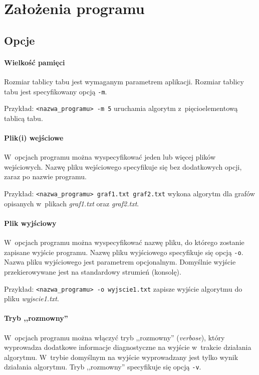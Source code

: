 \section{Założenia programu}

\subsection{Opcje}

\paragraph{Wielkość pamięci}

Rozmiar tablicy tabu jest wymaganym parametrem aplikacji. Rozmiar tablicy tabu jest specyfikowany opcją \verb+-m+. 

Przykład: \verb+<nazwa_programu> -m 5+ uruchamia algorytm z~pięcioelementową tablicą tabu.

\paragraph{Plik(i) wejściowe}

W~opcjach programu można wyspecyfikować jeden lub więcej plików wejściowych. Nazwę pliku wejściowego specyfikuje się bez dodatkowych opcji, zaraz po nazwie programu.

Przykład: \verb+<nazwa_programu> graf1.txt graf2.txt+ wykona algorytm dla grafów opisanych w~plikach \emph{graf1.txt} oraz \emph{graf2.txt}.

\paragraph{Plik wyjściowy}

W~opcjach programu można wyspecyfikować nazwę pliku, do którego zostanie zapisane wyjście programu. Nazwę pliku wyjściowego specyfikuje się opcją \verb+-o+. Nazwa pliku wyjściowego jest parametrem opcjonalnym. Domyślnie wyjście przekierowywane jest na standardowy strumień (konsolę).

Przykład: \verb+<nazwa_programu> -o wyjscie1.txt+ zapisze wyjście algorytmu do pliku \emph{wyjscie1.txt}.

\paragraph{Tryb ,,rozmowny''}

W~opcjach programu można włączyć tryb ,,rozmowny'' (\emph{verbose}), który wyprowadza dodatkowe informacje diagnostyczne na wyjście w~trakcie działania algorytmu. W~trybie domyślnym na wyjście wyprowadzany jest tylko wynik działania algorytmu. Tryb ,,rozmowny'' specyfikuje się opcją \verb+-v+.

